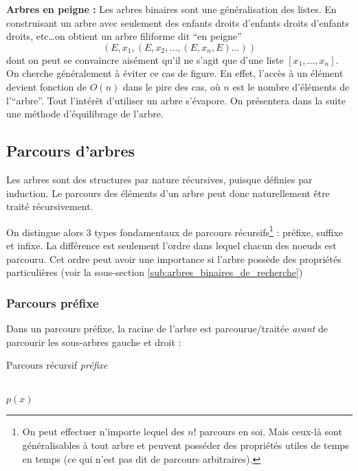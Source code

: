 \documentclass[../../../main.tex]{subfiles}
\begin{document}
\textbf{Arbres en peigne :} Les arbres binaires sont une généralisation des listes. En construisant un arbre avec seulement des enfants droits d'enfants droits d'enfants  droits, etc\dots on obtient un arbre filiforme dit ``en peigne'' $$(E, x_1, (E, x_2, \dots, (E, x_n, E)\dots))$$ dont on peut se convaincre aisément qu'il ne s'agit que d'une liste $[x_1, \dots, x_n]$. On cherche généralement à éviter ce cas de figure. En effet, l'accès à un élément devient fonction de $O(n)$ dans le pire des cas, où $n$ est le nombre d'éléments de l'``arbre''. Tout l'intérêt d'utiliser un arbre s'évapore. On présentera dans la suite une méthode d'équilibrage de l'arbre.
\subsection{Parcours d'arbres}
Les arbres sont des structures par nature récursives, puisque définies par induction. Le parcours des éléments d'un arbre peut donc naturellement être traité récursivement.

On distingue alors 3 types fondamentaux de parcours récursifs\footnote{On peut effectuer n'importe lequel des $n!$ parcours en soi. Mais ceux-là sont généralisables à tout arbre et peuvent posséder des propriétés utiles de temps en temps (ce qui n'est pas dit de parcours arbitraires).} : préfixe, suffixe et infixe. La différence est seulement l'ordre dans lequel chacun des noeuds est parcouru. Cet ordre peut avoir une importance si l'arbre possède des propriétés particulières (voir la sous-section \ref{sub:arbres_binaires_de_recherche})
\subsubsection{Parcours préfixe}
Dans un parcours préfixe, la racine de l'arbre est parcourue/traitée \textit{avant} de parcourir les sous-arbres gauche et droit :

\begin{algorithm}
\caption{Parcours récursif \textit{préfixe}\label{alg:arbre_parcours_prefixe}}
\Indm\nonl{} \\
\Indp
{} {
	 { 
	}
	 {
		$p(x)$\;
		\;
		\;
	}
}
\end{algorithm}
\end{document}
